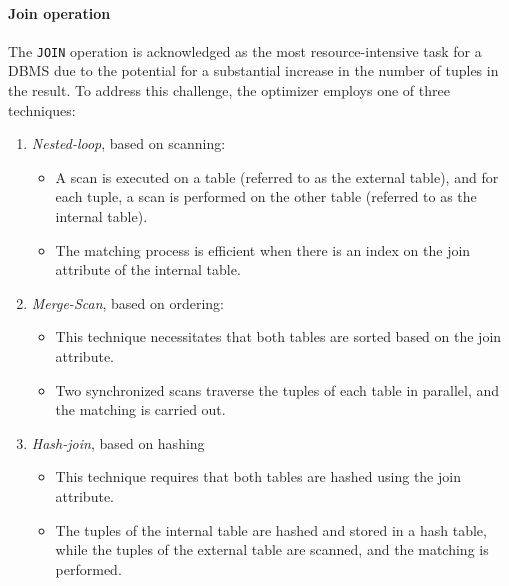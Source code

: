 \paragraph*{Join operation}
The \texttt{JOIN} operation is acknowledged as the most resource-intensive task for a DBMS due to the potential for a substantial increase in the number of tuples in the result. 
To address this challenge, the optimizer employs one of three techniques:
\begin{enumerate}
\item \textit{Nested-loop}, based on scanning: 
    \begin{itemize}
        \item A scan is executed on a table (referred to as the external table), and for each tuple, a scan is performed on the other table (referred to as the internal table).
        \item The matching process is efficient when there is an index on the join attribute of the internal table.
    \end{itemize}
\item \textit{Merge-Scan}, based on ordering:
    \begin{itemize}
        \item This technique necessitates that both tables are sorted based on the join attribute.
        \item Two synchronized scans traverse the tuples of each table in parallel, and the matching is carried out.
    \end{itemize}
\item \textit{Hash-join}, based on hashing
    \begin{itemize}
        \item This technique requires that both tables are hashed using the join attribute.
        \item The tuples of the internal table are hashed and stored in a hash table, while the tuples of the external table are scanned, and the matching is performed.
    \end{itemize}
\end{enumerate}

